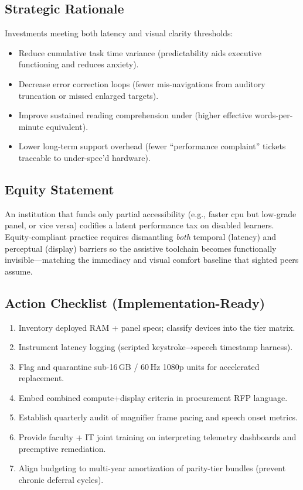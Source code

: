 \subsection*{Strategic Rationale}

Investments meeting both latency and visual clarity thresholds:
\begin{itemize}
	\item Reduce cumulative task time variance (predictability aids executive functioning and reduces anxiety).
	\item Decrease error correction loops (fewer mis-navigations from auditory truncation or missed enlarged targets).
	\item Improve sustained reading comprehension under  (higher effective words-per-minute equivalent).
	\item Lower long-term support overhead (fewer “performance complaint” tickets traceable to under-spec’d hardware).
\end{itemize}

\subsection*{Equity Statement}

An institution that funds only partial accessibility (e.g., faster \gls{cpu} but low-grade panel, or vice versa) codifies a latent performance tax on disabled learners. Equity-compliant practice requires dismantling \emph{both} temporal (latency) and perceptual (display) barriers so the assistive toolchain becomes functionally invisible—matching the immediacy and visual comfort baseline that sighted peers assume.

\subsection*{Action Checklist (Implementation-Ready)}

\begin{enumerate}
	\item Inventory deployed RAM + panel specs; classify devices into the tier matrix.
	\item Instrument latency logging (scripted keystroke→speech timestamp harness).
	\item Flag and quarantine sub-16\,GB / 60\,Hz 1080p units for accelerated replacement.
	\item Embed combined compute+display criteria in procurement RFP language.
	\item Establish quarterly audit of magnifier frame pacing and speech onset metrics.
	\item Provide faculty + IT joint training on interpreting telemetry dashboards and preemptive remediation.
	\item Align budgeting to multi-year amortization of parity-tier bundles (prevent chronic deferral cycles).
\end{enumerate}

